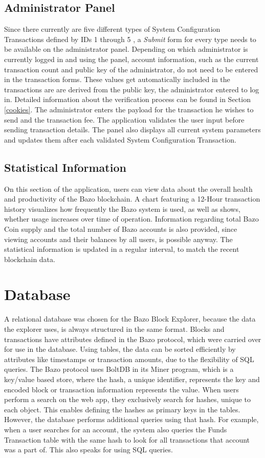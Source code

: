 \subsection{Administrator Panel}
Since there currently are five different types of System Configuration Transactions defined by IDs 1 through 5 \cite{bazo}, a \emph{Submit} form for every type needs to be available on the administrator panel. Depending on which administrator is currently logged in and using the panel, account information, such as the current transaction count and public key of the administrator, do not need to be entered in the transaction forms. These values get automatically included in the transactions are are derived from the public key, the administrator entered to log in. Detailed information about the verification process can be found in Section \ref{cookies}. The administrator enters the payload for the transaction he wishes to send and the transaction fee. The application validates the user input before sending transaction details. The panel also displays all current system parameters and updates them after each validated System Configuration Transaction. 

\subsection{Statistical Information}
On this section of the application, users can view data about the overall health and productivity of the Bazo blockchain. A chart featuring a 12-Hour transaction history visualizes how frequently the Bazo system is used, as well as shows, whether usage increases over time of operation. Information regarding total Bazo Coin supply and the total number of Bazo accounts is also provided, since viewing accounts and their balances by all users, is possible anyway. The statistical information is updated in a regular interval, to match the recent blockchain data.

\section{Database}
A relational database was chosen for the Bazo Block Explorer, because the data the explorer uses, is always structured in the same format. Blocks and transactions have attributes defined in the Bazo protocol, which were carried over for use in the database. Using tables, the data can be sorted efficiently by attributes like timestamps or transaction amounts, due to the flexibility of SQL queries. The Bazo protocol uses BoltDB \cite{bolt} in its Miner program, which is a key/value based store, where the hash, a unique identifier, represents the key and encoded block or transaction information represents the value.
When users perform a search on the web app, they exclusively search for hashes, unique to each object. This enables defining the hashes as primary keys in the tables. However, the database performs additional queries using that hash. For example, when a user searches for an account, the system also queries the Funds Transaction table with the same hash to look for all transactions that account was a part of. This also speaks for using SQL queries. 

